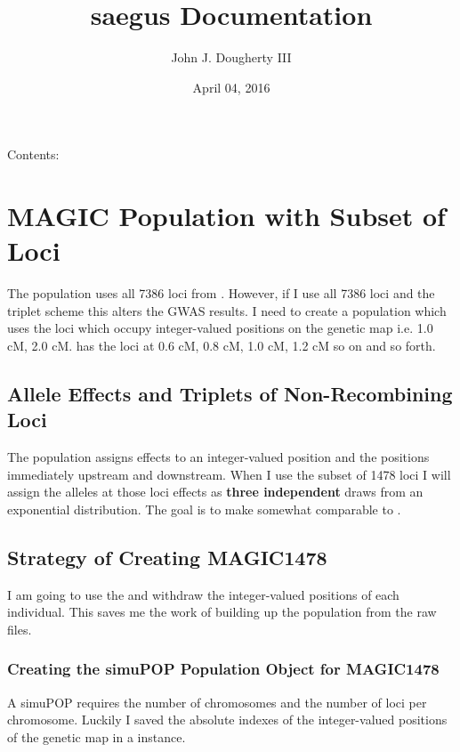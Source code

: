 \documentclass[letterpaper,10pt,english]{sphinxmanual}
\title{saegus Documentation}
\date{April 04, 2016}
\author{John J. Dougherty III}
\begin{document}
\maketitle
\tableofcontents
{}\label{contents::doc}


Contents:


\chapter{MAGIC Population with Subset of Loci}
\label{magic1478:magic-population-with-subset-of-loci}\label{magic1478:welcome-to-saegus-s-documentation}\label{magic1478::doc}
The  population uses all 7386 loci from . However,
if I use all 7386 loci and the triplet scheme this alters the GWAS results. I need
to create a population which uses the loci which occupy integer-valued positions on the
genetic map i.e. 1.0 cM, 2.0 cM.  has the loci at 0.6 cM, 0.8 cM, 1.0 cM, 1.2 cM
so on and so forth.


\section{Allele Effects and Triplets of Non-Recombining Loci}
\label{magic1478:allele-effects-and-triplets-of-non-recombining-loci}
The  population assigns effects to an integer-valued position
and the positions immediately upstream and downstream. When I use the subset of 1478 loci
I will assign the alleles at those loci effects as \textbf{three independent} draws from
an exponential distribution. The goal is to make  somewhat comparable to .


\section{Strategy of Creating MAGIC1478}
\label{magic1478:strategy-of-creating-magic1478}
I am going to use the  and withdraw the integer-valued positions of each individual.
This saves me the work of building up the population from the raw files.


\subsection{Creating the simuPOP Population Object for MAGIC1478}
\label{magic1478:creating-the-simupop-population-object-for-magic1478}
A simuPOP  requires the number of chromosomes and the number of loci per chromosome.
Luckily I saved the absolute indexes of the integer-valued positions of the genetic map in a
 instance.
\end{document}
